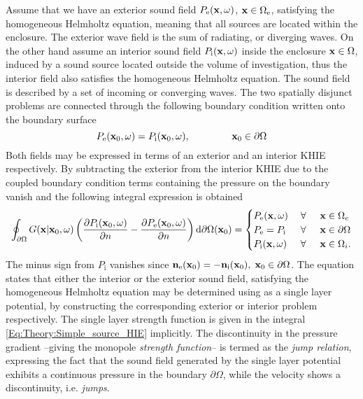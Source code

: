 Assume that we have an exterior sound field $P_{\mathrm{e}}(\mathbf{x},\omega)$, $\mathbf{x} \in \Omega_{\mathrm{e}}$, satisfying the homogeneous Helmholtz equation, meaning that all sources are located within the enclosure. The exterior wave field is the sum of  radiating, or diverging waves. On the other hand assume an interior sound field $P_{\mathrm{i}}(\mathbf{x},\omega)$ inside the enclosure $\mathbf{x} \in \Omega$, induced by a sound source located outside the volume of investigation, thus the interior field also satisfies the homogeneous Helmholtz equation. The sound field is described by a set of incoming or converging waves.
The two spatially disjunct problems are connected through the following boundary condition written onto the boundary surface
\begin{equation}
P_{\mathrm{e}}(\vxo,\omega) = P_{\mathrm{i}}(\vxo,\omega), \hspace{15mm} \vxo \in \partial \Omega
\end{equation}
Both fields may be expressed in terms of an exterior and an interior KHIE respectively.
By subtracting the exterior from the interior KHIE due to the coupled boundary condition terms containing the pressure on the boundary vanish and the following integral expression is obtained \cite[p.~268.]{Williams1999}
\begin{equation}
\oint_{\partial \Omega} 
G(\mathbf{x}|\mathbf{x}_0,\omega) 
\left(
\frac{\partial P_{\mathrm{i}}(\mathbf{x}_0,\omega)}{\partial n} - \frac{\partial P_{\mathrm{e}}(\mathbf{x}_0,\omega)}{\partial n} 
\right)
\mathrm{d} \partial \Omega ( \mathbf{x}_0)
= 
\begin{cases} 
P_{\mathrm{e}}(\mathbf{x},\omega)           & \hspace{1mm} \forall \hspace{5mm}  \mathbf{x} \in \Omega_e  	   \\
P_{\mathrm{e}}=P_{\mathrm{i}} & \hspace{1mm} \forall \hspace{5mm}         \mathbf{x} \in \partial \Omega  \\
P_{\mathrm{i}}(\mathbf{x},\omega) 			& \hspace{1mm} \forall \hspace{5mm}   \mathbf{x} \in \Omega_i.
\end{cases}
\label{Eq:Theory:Simple_source_HIE}
\end{equation}
The minus sign from $P_{\mathrm{i}}$ vanishes since $\mathbf{n}_{\mathrm{e}}(\mathbf{x}_0) = -\mathbf{n}_{\mathrm{i}}(\mathbf{x}_0), \hspace{1mm} {\mathbf{x}_0}\in \partial \Omega$. The equation states that either the interior or the exterior sound field, satisfying the homogeneous Helmholtz equation may be determined using as a single layer potential, by constructing the corresponding exterior or interior problem respectively. The single layer strength function is given in the integral \eqref{Eq:Theory:Simple_source_HIE} implicitly.
The discontinuity in the pressure gradient --giving the monopole \emph{strength function}-- is termed as the \emph{jump relation}, expressing the fact that the sound field generated by the single layer potential exhibits a continuous pressure in the boundary $\partial \Omega$, while the velocity shows a discontinuity, i.e. \emph{jumps}.


